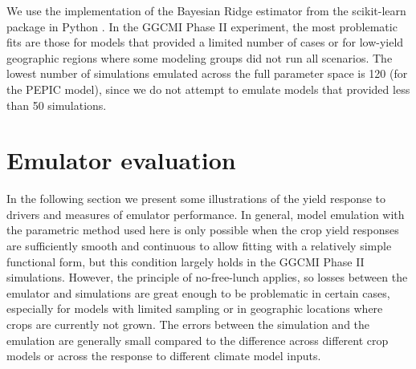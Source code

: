 \documentclass[gmd, manuscript]{copernicus} %
\begin{document}
We use the implementation of the Bayesian Ridge estimator from the scikit-learn package in Python \citep{scikit-learn}. 
In the GGCMI Phase II experiment, the most problematic fits are those for models that provided a limited number of cases or for low-yield geographic regions where some modeling groups did not run all scenarios. 
The lowest number of simulations emulated across the full parameter space is 120 (for the PEPIC model), since we do not attempt to emulate models that provided less than 50 simulations. 

\section{Emulator evaluation}
\label{S:4}
In the following section we present some illustrations of the yield response to drivers and measures of emulator performance. 
In general, model emulation with the parametric method used here is only possible when the crop yield responses are sufficiently smooth and continuous to allow fitting with a relatively simple functional form, but this condition largely holds in the GGCMI Phase II simulations. 
However, the principle of no-free-lunch applies, so losses between the emulator and simulations are great enough to be problematic in certain cases, especially for models with limited sampling or in geographic locations where crops are currently not grown. 
The errors between the simulation and the emulation are generally small compared to the difference across different crop models or across the response to different climate model inputs.
\end{document}
